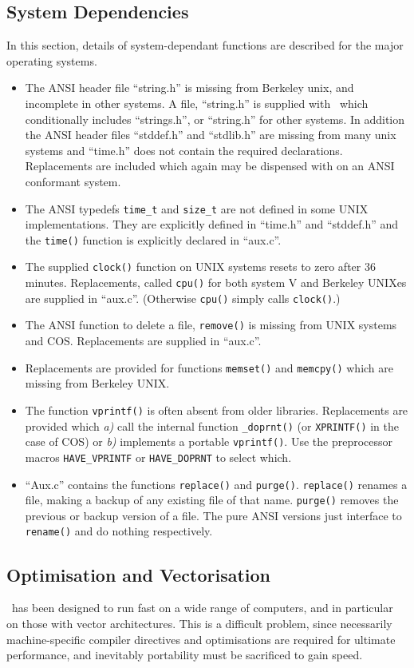 \subsection{System Dependencies}
In this section, details of system-dependant functions are described
for the major operating systems.  
\begin{itemize}
\item The ANSI header file ``string.h''	is missing
from Berkeley unix, and incomplete in other systems.  A file,
``string.h'' is supplied with \moldy\ which conditionally includes
``strings.h'', or ``string.h'' for other systems.  In addition the
ANSI header files ``stddef.h'' and ``stdlib.h'' are missing from many
unix systems and ``time.h'' does not contain the required
declarations.  Replacements are included  which again may
be dispensed with on an ANSI conformant system.
\item The  ANSI typedefs \verb'time_t' and \verb'size_t' are not
defined in some UNIX implementations. They are explicitly defined in
``time.h'' and ``stddef.h'' and the \verb'time()' function is
explicitly declared in ``aux.c''.
\item The supplied \verb'clock()' function on UNIX systems resets to
zero after 36 minutes.  Replacements, called \verb'cpu()' for both
system V and Berkeley UNIXes are supplied in ``aux.c''. (Otherwise
\verb'cpu()' simply calls \verb'clock()'.)
\item The ANSI function to delete a file, \verb'remove()' is missing
from UNIX systems and COS.  Replacements are supplied in ``aux.c''.
\item Replacements are provided for functions \verb'memset()' and
\verb'memcpy()' which are missing from Berkeley UNIX.
\item The function \verb'vprintf()' is often absent from older
libraries. Replacements are provided which {\em a)} call the internal
function \verb'_doprnt()' (or  \verb'XPRINTF()' in the case of COS) or
{\em b)} implements a portable \verb'vprintf()'.  Use the preprocessor
macros  \verb'HAVE_VPRINTF' or \verb'HAVE_DOPRNT' to select which.
\item ``Aux.c'' contains the functions \verb'replace()' and \verb'purge()'.
\verb'replace()' renames a file, making a backup of any existing file
of that name. \verb'purge()' removes the previous or backup version of
a file.  The pure ANSI versions just interface to \verb'rename()' and
do nothing respectively.
\end{itemize}

\subsection{Optimisation and Vectorisation}
\moldy\  has been designed to run fast on a wide range of computers, and
in particular on those with vector architectures. This is a difficult
problem, since necessarily machine-specific compiler directives and
optimisations are required for ultimate performance, and inevitably
portability must be sacrificed to gain speed.

